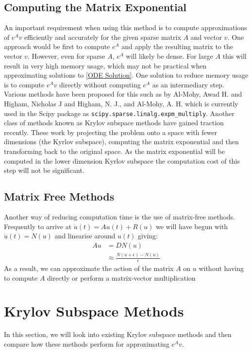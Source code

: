 \documentclass{article}
\begin{document}
\subsection{Computing the Matrix Exponential}
An important requirement when using this method is to compute approximations of $e^{A}v$ efficiently and accurately for the given sparse matrix $A$ and vector $v$.
One approach would be first to compute $e^A$ and apply the resulting matrix to the vector $v$.
However, even for sparse $A$, $e^{A}$ will likely be dense. For large $A$ this will result in very high memory usage, which may not be practical when approximating solutions to \eqref{ODE Solution}.
One solution to reduce memory usage is to compute $e^{A}v$ directly without computing $e^{A}$ as an intermediary step.\\
Various methods have been proposed for this such as by Al-Mohy, Awad H. and Higham, Nicholas J\cite{AlMohy2011} and Higham, N. J., and Al-Mohy, A. H. \cite{Higham2010} which is currently used in the Scipy package as \verb|scipy.sparse.linalg.expm_multiply|.
Another class of methods known as Krylov subspace methods have gained traction recently\cite{Moler2003}.
These work by projecting the problem onto a space with fewer dimensions (the Kyrlov subspace), computing the matrix exponential and then transforming back to the original space.
As the matrix exponential will be computed in the lower dimension Kyrlov subspace the computation cost of this step will not be significant.
\subsection{Matrix Free Methods}
Another way of reducing computation time is the use of matrix-free methods.
Frequently to arrive at $\dot u(t) = Au(t) + R(u)$ we will have begun with $\dot u(t) = N(u)$ and linearise around $u(t)$ giving:
\begin{align*}
Au &= DN(u)\\
&\approx \frac{N(u+\epsilon)-N(u)}{\epsilon}
\end{align*}
As a result, we can approximate the action of the matrix  $A$ on $u$ without having to compute $A$ directly or perform a matrix-vector multiplication

\section{Krylov Subspace Methods}
In this section, we will look into existing Krylov subspace methods and then compare how these methods perform for approximating $e^{A}v$.
\end{document}
